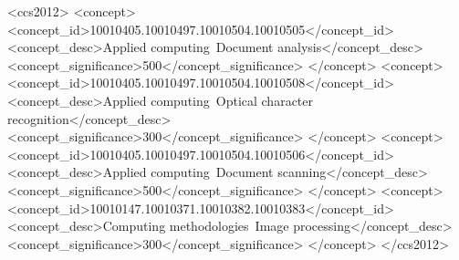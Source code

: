 \documentclass[acmtog]{acmart} %
\begin{document}





%
%
\begin{CCSXML}
<ccs2012>
   <concept>
       <concept_id>10010405.10010497.10010504.10010505</concept_id>
       <concept_desc>Applied computing~Document analysis</concept_desc>
       <concept_significance>500</concept_significance>
       </concept>
   <concept>
       <concept_id>10010405.10010497.10010504.10010508</concept_id>
       <concept_desc>Applied computing~Optical character recognition</concept_desc>
       <concept_significance>300</concept_significance>
       </concept>
   <concept>
       <concept_id>10010405.10010497.10010504.10010506</concept_id>
       <concept_desc>Applied computing~Document scanning</concept_desc>
       <concept_significance>500</concept_significance>
       </concept>
   <concept>
       <concept_id>10010147.10010371.10010382.10010383</concept_id>
       <concept_desc>Computing methodologies~Image processing</concept_desc>
       <concept_significance>300</concept_significance>
       </concept>
 </ccs2012>
\end{CCSXML}
\end{document}

